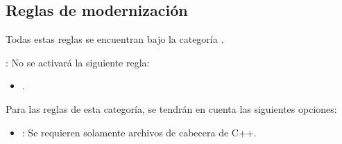 \subsection{Reglas de modernización}

Todas estas reglas se encuentran bajo la categoría .

: No se activará la siguiente regla:
\begin{itemize}

\item {}.

\end{itemize}

Para las reglas de esta categoría, se tendrán en cuenta las siguientes
opciones:

\begin{itemize}

\item {}:
Se requieren solamente archivos de cabecera de C++.

\end{itemize}
